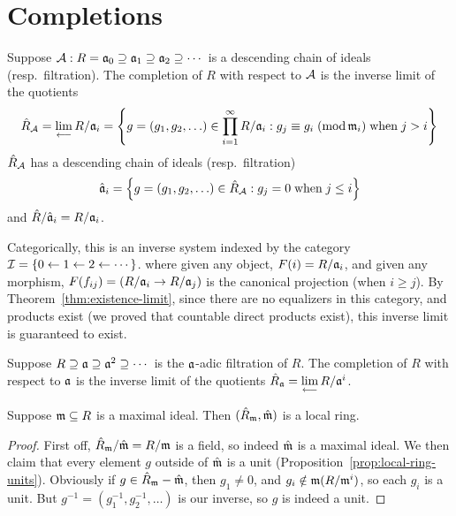 
\section{Completions}\label{sec:completions}

\begin{definition}
    Suppose \(\mathcal{A}: R = \mathfrak{a}_0 \supseteq \mathfrak{a}_1 \supseteq \mathfrak{a}_2 \supseteq \cdots\)
    is a descending chain of ideals (resp.\ filtration).
    The completion of \(R\) with respect to \(\mathcal{A}\) is the inverse limit of the quotients
    \begin{equation*}
        \hat{R}_\mca{A} = \invlim R/\mfk{a}_i
        = \Bqty{g = (g_1,g_2,\hdots) \in \prod_{i=1}^\infty R/\mfk{a}_i: g_j \equiv g_i\;(\text{mod}\,\mfk{m}_i)\;\text{when}\; j > i}
    \end{equation*}
    \(\hat{R}_{\mathcal{A}}\) has a descending chain of ideals (resp.\ filtration)
    \begin{equation*}
        \hat{\mfk{a}}_i = \Bqty{g = (g_1,g_2,\hdots) \in \hat{R}_\mca{A}: g_j = 0 \;\text{when}\; j \leq i}
    \end{equation*}
    and \(\hat{R}/\hat{\mathfrak{a}}_i = R/\mathfrak{a}_i\).
\end{definition}
\begin{remark}
    Categorically, this is an inverse system indexed by the category \(\mathcal{I} = \{0 \leftarrow 1 \leftarrow 2 \leftarrow \cdots\}\).
    where given any object, \(F(i) = R/\mathfrak{a}_i\),
    and given any morphism, \(F(f_{ij}) = (R/\mathfrak{a}_i \to R/\mathfrak{a}_j)\) is the canonical projection (when \(i \geq j\)).
    By Theorem~\ref{thm:existence-limit},
    since there are no equalizers in this category,
    and products exist (we proved that countable direct products exist),
    this inverse limit is guaranteed to exist.
\end{remark}
\begin{definition}
    Suppose \(R \supseteq \mathfrak{a} \supseteq \mathfrak{a}^2 \supseteq \cdots\)
    is the \(\mathfrak{a}\)-adic filtration of \(R\).
    The completion of \(R\) with respect to \(\mathfrak{a}\) is the inverse limit of the quotients
    \(\hat{R}_{\mathfrak{a}} = \operatorname{\displaystyle\lim_{\longleftarrow}} R/\mathfrak{a}^i\).
\end{definition}

\begin{lemma}
    Suppose \(\mathfrak{m} \subseteq R\) is a maximal ideal.
    Then \((\hat{R}_{\mathfrak{m}},\hat{\mathfrak{m}})\) is a local ring.
\end{lemma}
\begin{proof}
    First off, \(\hat{R}_{\mathfrak{m}}/\hat{\mathfrak{m}} = R/\mathfrak{m}\) is a field,
    so indeed \(\hat{\mathfrak{m}}\) is a maximal ideal.
    We then claim that every element \(g\) outside of \(\hat{\mathfrak{m}}\) is a unit (Proposition~\ref{prop:local-ring-units}).
    Obviously if \(g \in \hat{R}_{\mathfrak{m}} - \hat{\mathfrak{m}}\),
    then \(g_1 \neq 0\), and \(g_i \notin \mathfrak{m}(R/\mathfrak{m}^i)\), so each \(g_i\) is a unit.
    But \(g^{-1} = (g_1^{-1},g_2^{-1},\hdots)\) is our inverse,
    so \(g\) is indeed a unit.
\end{proof}

